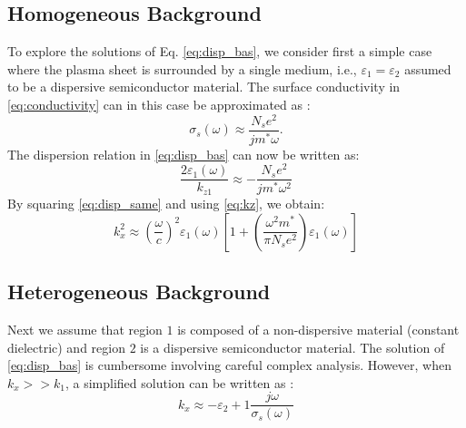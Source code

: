 \documentclass[conference, 10pt]{IEEEtran}
\renewcommand{\O}{\omega}  %
\newcommand{\E}{\varepsilon}  %
\renewcommand{\^}{\hat}  %
\begin{document}
\subsection{Homogeneous Background}
%
To explore the solutions of Eq. \eqref{eq:disp_bas}, we consider first a simple case where the plasma sheet is surrounded by a single medium, i.e., $\E_1 = \E_2$ assumed to be a dispersive semiconductor material. The surface conductivity in \eqref{eq:conductivity} can in this case be approximated as \cite{stern1967polarizability}:
%
\begin{equation}
  \sigma_s(\O) \approx \frac{N_s e^2}{j m^{\ast}\O}.
  \label{eq:conductivity_app}
\end{equation}
%
The dispersion relation in \eqref{eq:disp_bas} can now be written as:
%
\begin{equation}
  \frac{2 \E_1(\O)}{k_{z1}} \approx -\frac{N_s e^2}{j m^{\ast}\O^2}
  \label{eq:disp_same}
\end{equation}
%
By squaring \eqref{eq:disp_same} and using \eqref{eq:kz}, we obtain:
\begin{equation}
  k_x^2 \approx \left(\frac{\O}{c}\right)^2 \E_1(\O) \left[1 + \left(\frac{\O^2 m^{\ast}}{\pi N_s e^2}\right) \E_1(\O) \right]
  \label{eq:disp_same}
\end{equation}
%
%
%
%
\subsection{Heterogeneous Background}

Next we assume that region $1$ is composed of a non-dispersive material (constant dielectric) and region $2$ is a dispersive semiconductor material. The solution of \eqref{eq:disp_bas} is cumbersome involving careful complex analysis. However, when $k_x >> k_1$, a simplified solution can be written as \cite{jablan2009plasmonics}:
\begin{equation}
  k_x \approx - {\E_2 + 1} \frac{j \O}{\sigma_s(\O)}
  \label{eq:disp_diff}
\end{equation}


\end{document}
